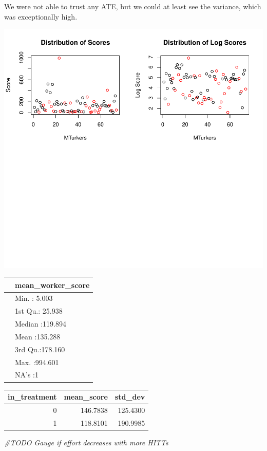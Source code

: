 \documentclass[
]{article}
\newenvironment{Shaded}{\begin{snugshade}}{\end{snugshade}}
\newcommand{\CommentTok}[1]{\textcolor[rgb]{0.56,0.35,0.01}{\textit{#1}}}
\begin{document}
We were not able to trust any ATE, but we could at least see the
variance, which was exceptionally high.

\includegraphics{team_mturk_experiments_files/figure-latex/plot_experiment_1-1.pdf}

\begin{tabular}{l|l}
\hline
  & mean\_worker\_score\\
\hline
 & Min.   :  5.003\\
\hline
 & 1st Qu.: 25.938\\
\hline
 & Median :119.894\\
\hline
 & Mean   :135.288\\
\hline
 & 3rd Qu.:178.160\\
\hline
 & Max.   :994.601\\
\hline
 & NA's   :1\\
\hline
\end{tabular}

\begin{tabular}{r|r|r}
\hline
in\_treatment & mean\_score & std\_dev\\
\hline
0 & 146.7838 & 125.4300\\
\hline
1 & 118.8101 & 190.9985\\
\hline
\end{tabular}

\begin{Shaded}
\begin{Highlighting}[]
\CommentTok{#TODO Gauge if effort decreases with more HITTs}
\end{Highlighting}
\end{Shaded}
\end{document}
